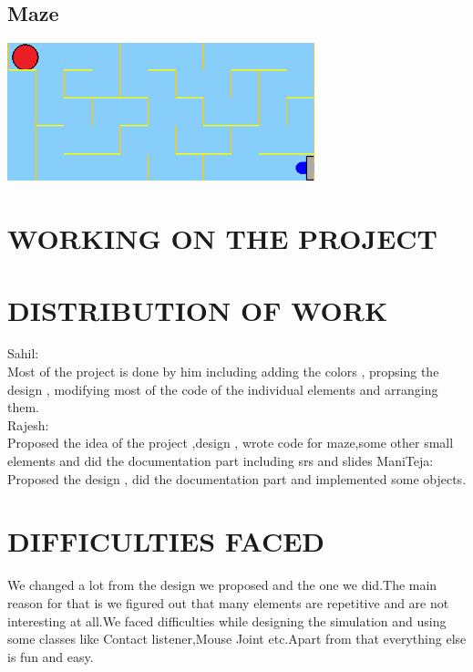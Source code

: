 \documentclass[a4paper, 11pt]{article}
\begin{document}
\subsection*{Maze}
\begin{center}
\includegraphics[height=4cm]{img/maze.png}    
\end{center}

\clearpage
\section{\large{WORKING ON THE PROJECT}}

\large{
\vspace{40pt}
\section{\large{DISTRIBUTION OF WORK}}
\large{
Sahil:\\
Most of the project is done by him including adding the colors , propsing the design , modifying most of the code of the individual elements and arranging them.\\
Rajesh:\\
Proposed the idea of the project ,design , wrote code for maze,some other small elements and did the documentation part including srs and slides
ManiTeja:\\
Proposed the design , did the documentation part and implemented some objects.
}
\section{\large{ DIFFICULTIES FACED}}
\large{
We changed a lot from the design we proposed and the one we did.The main reason for that is we figured out that many  elements are repetitive and are not interesting at all.We faced difficulties while designing the simulation and using some classes like Contact listener,Mouse Joint etc.Apart from that everything else is fun and easy.
}
}
\clearpage
\end{document}
